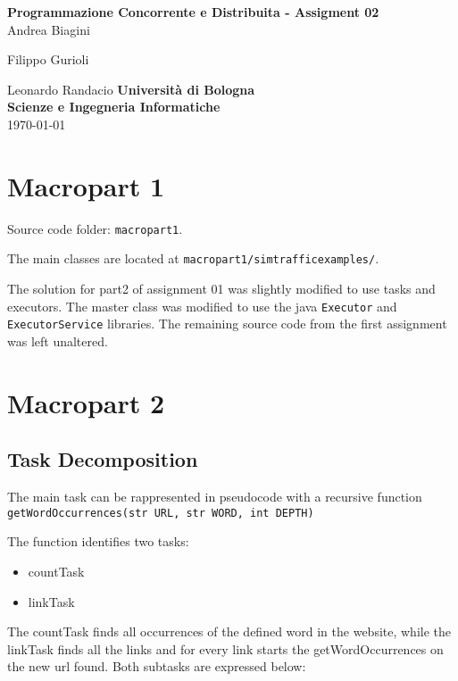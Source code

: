 \documentclass[12pt, a4paper]{report}
\begin{document}
\renewcommand\bibname{References} %


\begin{titlepage}

\begin{center}

\Large \textbf {Programmazione Concorrente e Distribuita - Assigment 02}\\%
\vspace{1em}%
\vfill
Andrea Biagini


Filippo Gurioli


Leonardo Randacio
\vspace{1em}
\vfill
{\bf Università di Bologna \\ Scienze e Ingegneria Informatiche}\\[0.5in]

       
\vfill
\today

\end{center}

\end{titlepage}


\tableofcontents
\listoffigures

\newpage
{} %

\chapter{Macropart 1}
Source code folder: \texttt{macropart1}.

The main classes are located at \texttt{macropart1/simtrafficexamples/}.

The solution for part2 of assignment 01 was slightly modified to use tasks and executors. The master class was modified to use the java \texttt{Executor} and \texttt{ExecutorService} libraries.
The remaining source code from the first assignment was left unaltered.
\chapter{Macropart 2}
\section{Task Decomposition}
The main task can be rappresented in pseudocode with a recursive function \texttt{getWordOccurrences(str URL, str WORD, int DEPTH)}

The function identifies two tasks:
\begin{itemize}
    \item countTask
    \item linkTask
\end{itemize}
The countTask finds all occurrences of the defined word in the website, while the linkTask finds all the links and for every link starts the
 getWordOccurrences on the new url found. Both subtasks are expressed below:
\end{document}
